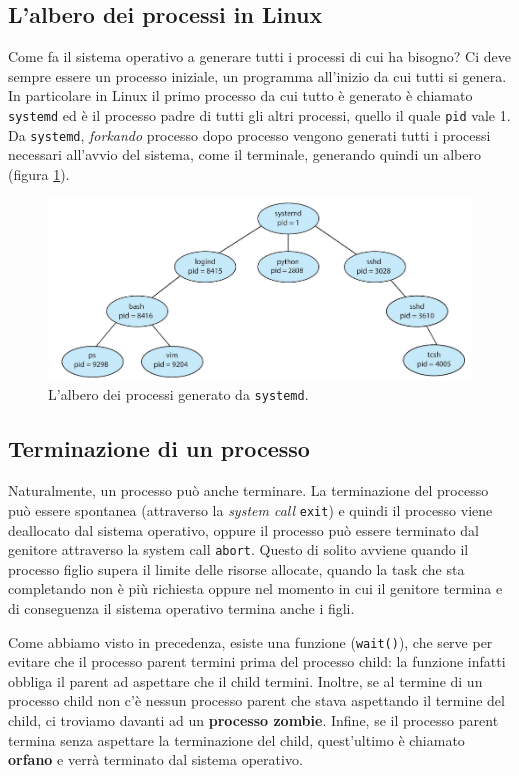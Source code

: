 %
\subsection{L'albero dei processi in Linux}
Come fa il sistema operativo a generare tutti i processi di cui ha bisogno? Ci deve sempre essere un processo iniziale, un programma all'inizio da cui tutti si genera. In particolare in Linux il primo processo da cui tutto è generato è chiamato \texttt{systemd} ed è il processo padre di tutti gli altri processi, quello il quale \texttt{pid} vale 1. Da \texttt{systemd}, \textit{forkando} processo dopo processo vengono generati tutti i processi necessari all'avvio del sistema, come il terminale, generando quindi un albero (figura \ref{fig:three_of_processes}).

\begin{figure}[h]
    \centering
    \includegraphics[width = .6\textwidth]{../res/imgs/processes/three_of_processes.png}
    \caption{L'albero dei processi generato da \texttt{systemd}.}
    \label{fig:three_of_processes}
\end{figure}

% 
\subsection{Terminazione di un processo}
Naturalmente, un processo può anche terminare. La terminazione del processo può essere spontanea (attraverso la \textit{system call} \texttt{exit}) e quindi il processo viene deallocato dal sistema operativo, oppure il processo può essere terminato dal genitore attraverso la system call \texttt{abort}. Questo di solito avviene quando il processo figlio supera il limite delle risorse allocate, quando la task che sta completando non è più richiesta oppure nel momento in cui il genitore termina e di conseguenza il sistema operativo termina anche i figli.

Come abbiamo visto in precedenza, esiste una funzione (\texttt{wait()}), che serve per evitare che il processo parent termini prima del processo child: la funzione infatti obbliga il parent ad aspettare che il child termini. Inoltre, se al termine di un processo child non c'è nessun processo parent che stava aspettando il termine del child, ci troviamo davanti ad un \textbf{processo zombie}. Infine, se il processo parent termina senza aspettare la terminazione del child, quest'ultimo è chiamato \textbf{orfano} e verrà terminato dal sistema operativo.


